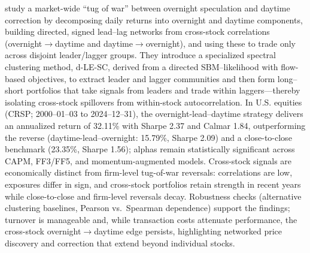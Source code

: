 \cite{lu2025tugofwar} study a market-wide “tug of war” between overnight speculation and daytime correction by decomposing daily returns into overnight and daytime components, building directed, signed lead–lag networks from cross-stock correlations (overnight$\to$daytime and daytime$\to$overnight), and using these to trade only across disjoint leader/lagger groups. They introduce a specialized spectral clustering method, d-LE-SC, derived from a directed SBM–likelihood with flow-based objectives, to extract leader and lagger communities and then form long–short portfolios that take signals from leaders and trade within laggers—thereby isolating cross-stock spillovers from within-stock autocorrelation. In U.S. equities (CRSP; 2000–01–03 to 2024–12–31), the overnight-lead–daytime strategy delivers an annualized return of 32.11\% with Sharpe 2.37 and Calmar 1.84, outperforming the reverse (daytime-lead–overnight: 15.79\%, Sharpe 2.09) and a close-to-close benchmark (23.35\%, Sharpe 1.56); alphas remain statistically significant across CAPM, FF3/FF5, and momentum-augmented models. Cross-stock signals are economically distinct from firm-level tug-of-war reversals: correlations are low, exposures differ in sign, and cross-stock portfolios retain strength in recent years while close-to-close and firm-level reversals decay. Robustness checks (alternative clustering baselines, Pearson vs.\ Spearman dependence) support the findings; turnover is manageable and, while transaction costs attenuate performance, the cross-stock overnight$\to$daytime edge persists, highlighting networked price discovery and correction that extend beyond individual stocks.

